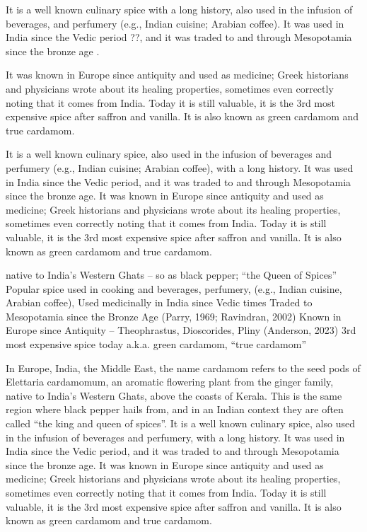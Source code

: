 \documentclass[12pt]{article}
\begin{document}
It is a well known culinary spice with a long history, also used in the infusion of beverages, and perfumery (e.g., Indian cuisine; Arabian coffee). It was used in India since the Vedic period ??, and it was traded to and through Mesopotamia since the bronze age \parencites{parry_1969_spices}{ravindran_2002_cardamom}. 

It was known in Europe since antiquity and used as medicine; Greek historians and physicians wrote about its healing properties, sometimes even correctly noting that it comes from India. Today it is still valuable, it is the 3rd most expensive spice after saffron and vanilla. It is also known as green cardamom and true cardamom.  


It is a well known culinary spice, also used in the infusion of beverages and perfumery (e.g., Indian cuisine; Arabian coffee), with a long history. It was used in India since the Vedic period, and it was traded to and through Mesopotamia since the bronze age. It was known in Europe since antiquity and used as medicine; Greek historians and physicians wrote about its healing properties, sometimes even correctly noting that it comes from India. Today it is still valuable, it is the 3rd most expensive spice after saffron and vanilla. It is also known as green cardamom and true cardamom.

native to India’s Western Ghats – so as black pepper; “the Queen of Spices”
Popular spice used in cooking and beverages, perfumery, (e.g., Indian cuisine, Arabian coffee), 
Used medicinally in India since Vedic times
Traded to Mesopotamia since the Bronze Age (Parry, 1969; Ravindran, 2002)
Known in Europe since Antiquity – Theophrastus, Dioscorides, Pliny (Anderson, 2023)
3rd most expensive spice today
a.k.a. green cardamom, “true cardamom”



In Europe, India, the Middle East, the name cardamom refers to the seed pods of Elettaria cardamomum, 
an aromatic flowering plant from the ginger family, 
native to India’s Western Ghats, above the coasts of Kerala. This is the same region where black pepper hails from, and in an Indian context they are often called “the king and queen of spices”.
It is a well known culinary spice, also used in the infusion of beverages and perfumery, with a long history. 
It was used in India since the Vedic period, and 
it was traded to and through Mesopotamia since the bronze age. 
It was known in Europe since antiquity and used as medicine; Greek historians and physicians wrote about its healing properties, sometimes even correctly noting that it comes from India.
Today it is still valuable, it is the 3rd most expensive spice after saffron and vanilla.
It is also known as green cardamom and true cardamom.
\end{document}
